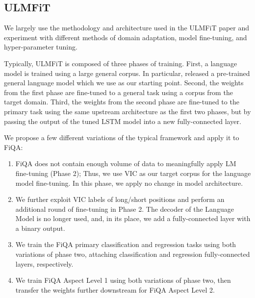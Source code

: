 \documentclass[11pt,a4paper]{article}
\begin{document}
\subsection{ULMFiT}
\label{ssec:ulmfit}


We largely use the methodology and architecture used in the ULMFiT \cite{howard2018universal} paper and experiment with different methods of domain adaptation, model fine-tuning, and hyper-parameter tuning.

Typically, ULMFiT is composed of three phases of training. First, a language model is trained using a large general corpus. In particular,  released a pre-trained general language model which we use as our starting point. Second, the weights from the first phase are fine-tuned to a general task using a corpus from the target domain. Third, the weights from the second phase are fine-tuned to the primary task using the same upstream architecture as the first two phases, but by passing the output of the tuned LSTM model into a new fully-connected layer.

We propose a few different variations of the typical framework and apply it to FiQA:

\begin{enumerate}
\item FiQA does not contain enough volume of data to meaningfully apply LM fine-tuning (Phase 2); Thus, we use VIC as our target corpus for the language model fine-tuning. In this phase, we apply no change in model architecture.
\item We further exploit VIC labels of long/short positions and perform an additional round of fine-tuning in Phase 2. The decoder of the Language Model is no longer used, and, in its place, we add a fully-connected layer with a binary output.
\item We train the FiQA primary classification and regression tasks using both variations of phase two, attaching classification and regression fully-connected layers, respectively.
\item We train FiQA Aspect Level 1 using both variations of phase two, then transfer the weights further downstream for FiQA Aspect Level 2.
\end{enumerate}
\end{document}
